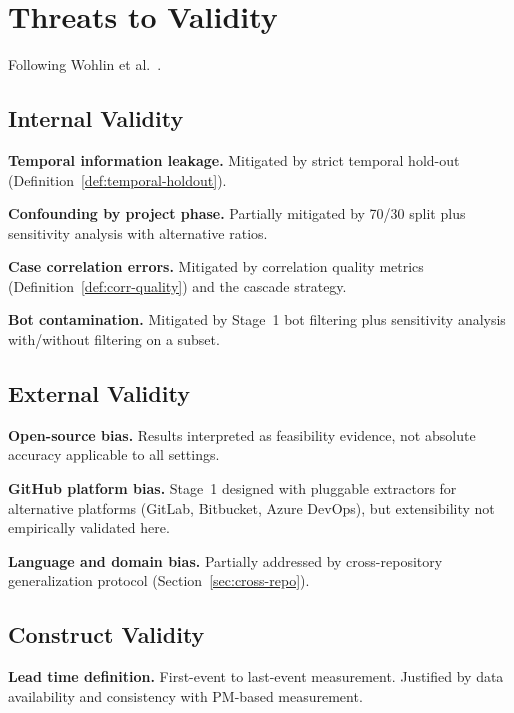 \section{Threats to Validity}
\label{sec:threats}

Following Wohlin et al.~\cite{wohlin2012experimentation}.

\subsection{Internal Validity}
\label{sec:threats-internal}

\textbf{Temporal information leakage.} Mitigated by strict temporal
hold-out (Definition~\ref{def:temporal-holdout}).

\textbf{Confounding by project phase.} Partially mitigated by 70/30 split
plus sensitivity analysis with alternative ratios.

\textbf{Case correlation errors.} Mitigated by correlation quality
metrics (Definition~\ref{def:corr-quality}) and the cascade strategy.

\textbf{Bot contamination.} Mitigated by Stage~1 bot filtering plus
sensitivity analysis with/without filtering on a subset.


\subsection{External Validity}
\label{sec:threats-external}

\textbf{Open-source bias.} Results interpreted as feasibility evidence,
not absolute accuracy applicable to all settings.

\textbf{GitHub platform bias.} Stage~1 designed with pluggable extractors
for alternative platforms (GitLab, Bitbucket, Azure DevOps), but
extensibility not empirically validated here.

\textbf{Language and domain bias.} Partially addressed by cross-repository
generalization protocol (Section~\ref{sec:cross-repo}).


\subsection{Construct Validity}
\label{sec:threats-construct}

\textbf{Lead time definition.} First-event to last-event measurement.
Justified by data availability and consistency with PM-based measurement.

